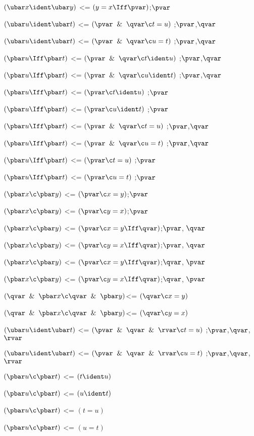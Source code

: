 $(\ubar x \ident \ubar y)$ <= $(y = x\Iff \pvar)$;$\pvar$

$(\ubar u \ident \ubar t)$ <= $(\pvar\And\qvar \c t = u)$ ;$\pvar$,$\qvar$

$(\ubar u \ident \ubar t)$ <= $(\pvar \And \qvar\c u = t)$ ;$\pvar$,$\qvar$

$(\pbar u \Iff \pbar t)$ <= $(\pvar\And\qvar \c t \ident u)$ ;$\pvar$,$\qvar$

$(\pbar u \Iff \pbar t)$ <= $(\pvar \And \qvar\c u \ident t)$ ;$\pvar$,$\qvar$

$(\pbar u \Iff \pbar t)$ <= $(\pvar\c t \ident u)$ ;$\pvar$

$(\pbar u \Iff \pbar t)$ <= $(\pvar \c u \ident t)$ ;$\pvar$

$(\pbar u \Iff \pbar t)$ <= $(\pvar\And\qvar \c t = u)$ ;$\pvar$,$\qvar$

$(\pbar u \Iff \pbar t)$ <= $(\pvar \And \qvar\c u = t)$ ;$\pvar$,$\qvar$

$(\pbar u \Iff \pbar t)$ <= $(\pvar\c t = u)$ ;$\pvar$

$(\pbar u \Iff \pbar t)$ <= $(\pvar \c u = t)$ ;$\pvar$

$(\pbar x \c \pbar y)$ <= $(\pvar \c x = y)$;$\pvar$

$(\pbar x \c \pbar y)$ <= $(\pvar \c y = x)$;$\pvar$

$(\pbar x \c \pbar y)$ <= $(\pvar \c x = y \Iff \qvar)$;$\pvar$, $\qvar$

$(\pbar x \c \pbar y)$ <= $(\pvar \c y = x \Iff \qvar)$;$\pvar$, $\qvar$

$(\pbar x \c \pbar y)$ <= $(\pvar \c x = y \Iff \qvar)$;$\qvar$, $\pvar$

$(\pbar x \c \pbar y)$ <= $(\pvar \c y = x \Iff \qvar)$;$\qvar$, $\pvar$

$(\qvar \And \pbar x \c \qvar \And \pbar y)$<= $(\qvar \c x = y)$

$(\qvar \And \pbar x \c \qvar \And \pbar y)$<= $(\qvar \c y = x)$

$(\ubar u \ident \ubar t)$ <= $(\pvar\And\qvar\And\rvar \c t = u)$ ;$\pvar$,$\qvar$,$\rvar$

$(\ubar u \ident \ubar t)$ <= $(\pvar \And \qvar\And\rvar\c u = t)$ ;$\pvar$,$\qvar$,$\rvar$

$(\pbar u \c \pbar t)$ <= $(t \ident u)$ 

$(\pbar u \c \pbar t)$ <= $(u \ident t)$ 

$(\pbar u \c \pbar t)$ <= $(t = u)$ 

$(\pbar u \c \pbar t)$ <= $(u = t)$ 

